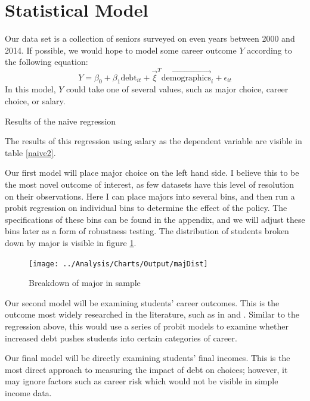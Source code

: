 \documentclass{article}
\newcommand{\regs}{../Analysis/Regressions/Output/}
\begin{document}
	\section{Statistical Model}
	
	Our data set is a collection of seniors surveyed on even years between 2000 and 2014. If possible, we would hope to model some career outcome $Y$ according to the following equation: $$Y = \beta_0 + \beta_1 \mbox{debt}_{it} + \vec{\xi}^T \vec{\mbox{demographics}}_i + \epsilon_{it}$$ In this model, $Y$ could take one of several values, such as major choice, career choice, or salary. 
	
	\begin{table}
		\centering
		
		
		\caption{Results of the naive regression}
		\label{naive2}
	\end{table}
	
	The results of this regression using salary as the dependent variable are visible in table \ref{naive2}. 
	
	Our first model will place major choice on the left hand side. I believe this to be the most novel outcome of interest, as few datasets have this level of resolution on their observations. Here I can place majors into several bins, and then run a probit regression on individual bins to determine the effect of the policy. The specifications of these bins can be found in the appendix, and we will adjust these bins later as a form of robustness testing. The distribution of students broken down by major is visible in figure \ref{majDist}.

	\begin{figure}
		\centering
		\texttt{[image: ../Analysis/Charts/Output/majDist]}
		\caption{Breakdown of major in sample}
		\label{majDist}
	\end{figure}
	
	Our second model will be examining students' career outcomes. This is the outcome most widely researched in the literature, such as in \textcite{rothstein2011} and \textcite{field2009}. Similar to the regression above, this would use a series of probit models to examine whether increased debt pushes students into certain categories of career.
	
	Our final model will be directly examining students' final incomes. This is the most direct approach to measuring the impact of debt on choices; however, it may ignore factors such as career risk which would not be visible in simple income data.
	
\end{document}
